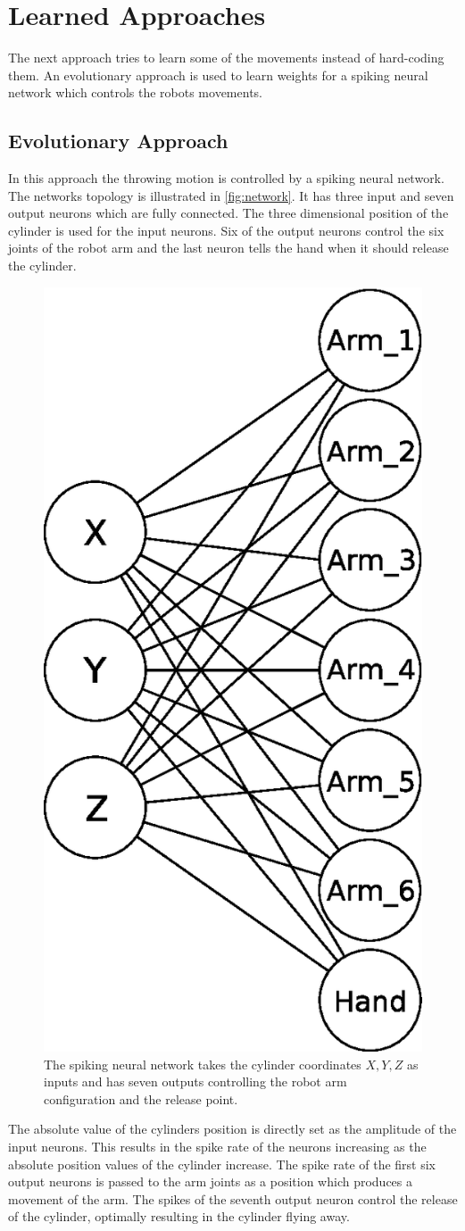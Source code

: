 \section{Learned Approaches}
\label{sec:learned}
The next approach tries to learn some of the movements instead of hard-coding them.
An evolutionary approach is used to learn weights for a spiking neural network which controls the robots movements.

\subsection{Evolutionary Approach}
In this approach the throwing motion is controlled by a spiking neural network.
The networks topology is illustrated in \autoref{fig:network}.
It has three input and seven output neurons which are fully connected.
The three dimensional position of the cylinder is used for the input neurons.
Six of the output neurons control the six joints of the robot arm and the last neuron tells the hand when it should release the cylinder.

\begin{figure}[h]
\centering
\includegraphics[width=.4\columnwidth]{figures/net.eps}
\caption{The spiking neural network takes the cylinder coordinates $X, Y, Z$ as inputs and has seven outputs controlling the robot arm configuration and the release point.}
\label{fig:network}
\end{figure}

The absolute value of the cylinders position is directly set as the amplitude of the input neurons.
This results in the spike rate of the neurons increasing as the absolute position values of the cylinder increase.
The spike rate of the first six output neurons is passed to the arm joints as a position which produces a movement of the arm.
The spikes of the seventh output neuron control the release of the cylinder, optimally resulting in the cylinder flying away.

